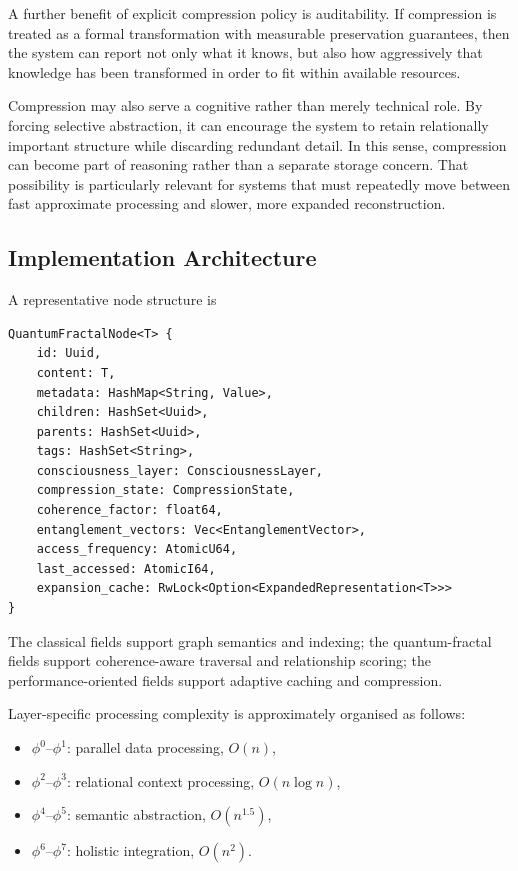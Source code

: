 \documentclass[12pt]{article}
\begin{document}
A further benefit of explicit compression policy is auditability. If compression is treated as a formal transformation with measurable preservation guarantees, then the system can report not only what it knows, but also how aggressively that knowledge has been transformed in order to fit within available resources.

Compression may also serve a cognitive rather than merely technical role. By forcing selective abstraction, it can encourage the system to retain relationally important structure while discarding redundant detail. In this sense, compression can become part of reasoning rather than a separate storage concern. That possibility is particularly relevant for systems that must repeatedly move between fast approximate processing and slower, more expanded reconstruction.

\subsection{Implementation Architecture}
A representative node structure is
\begin{verbatim}
QuantumFractalNode<T> {
    id: Uuid,
    content: T,
    metadata: HashMap<String, Value>,
    children: HashSet<Uuid>,
    parents: HashSet<Uuid>,
    tags: HashSet<String>,
    consciousness_layer: ConsciousnessLayer,
    compression_state: CompressionState,
    coherence_factor: float64,
    entanglement_vectors: Vec<EntanglementVector>,
    access_frequency: AtomicU64,
    last_accessed: AtomicI64,
    expansion_cache: RwLock<Option<ExpandedRepresentation<T>>>
}
\end{verbatim}
The classical fields support graph semantics and indexing; the quantum-fractal fields support coherence-aware traversal and relationship scoring; the performance-oriented fields support adaptive caching and compression.

Layer-specific processing complexity is approximately organised as follows:
\begin{itemize}[leftmargin=2em]
    \item $\phi^0$--$\phi^1$: parallel data processing, $O(n)$,
    \item $\phi^2$--$\phi^3$: relational context processing, $O(n\log n)$,
    \item $\phi^4$--$\phi^5$: semantic abstraction, $O(n^{1.5})$,
    \item $\phi^6$--$\phi^7$: holistic integration, $O(n^2)$.
\end{itemize}
\end{document}
